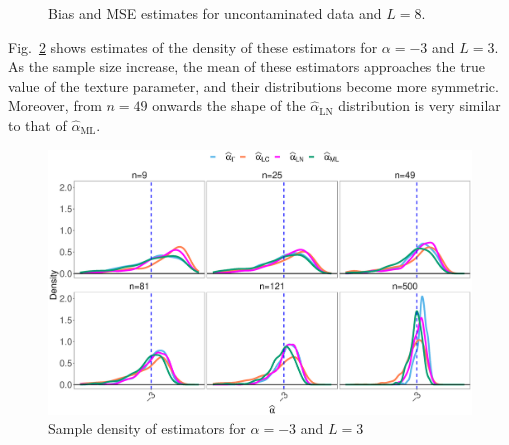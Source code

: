 \documentclass[twocolumn]{svjour3}
\begin{document}
	\begin{figure}[hbt]
		\centering
		\caption{Bias and MSE estimates for uncontaminated data and $L=8$.}\label{SesgoyECMSinContL=8} 
	\end{figure}
	
	
	Fig.~\ref{Fig:DistributionL=3_alfa=-3} shows estimates of the density of these estimators for $\alpha=-3$ and $L=3$. 
	As the sample size increase, the mean of these estimators approaches the true value of the texture parameter, and their distributions become more symmetric. 
	Moreover, from $n=49$ onwards the shape of the $\widehat{\alpha}_{\text{{LN}}}$ distribution is very similar to that of $\widehat{\alpha}_{\text{{ML}}}$.
	
	\begin{figure}[hbt]
		\centering
		\includegraphics[width=1\linewidth]{DensidadEstimadorNoCont.eps}
		\caption{\label{Fig:DistributionL=3_alfa=-3} Sample density of estimators for $\alpha=-3$ and  $L=3$ }
	\end{figure}
	
\end{document}
